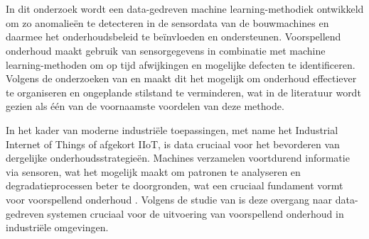 
\chapter{}%
\label{ch:methodologie}


In dit onderzoek wordt een data-gedreven machine learning-methodiek ontwikkeld om zo anomalieën te detecteren in de sensordata van de bouwmachines en daarmee het onderhoudsbeleid te beïnvloeden en ondersteunen. Voorspellend onderhoud maakt gebruik van sensorgegevens in combinatie met machine learning-methoden om op tijd afwijkingen en mogelijke defecten te identificeren. Volgens de onderzoeken van \textcite{Carvalho2019} en \textcite{ErRatby2025} maakt dit het mogelijk om onderhoud effectiever te organiseren en ongeplande stilstand te verminderen, wat in de literatuur wordt gezien als één van de voornaamste voordelen van deze methode.

In het kader van moderne industriële toepassingen, met name het Industrial Internet of Things of afgekort IIoT, is data cruciaal voor het bevorderen van dergelijke onderhoudsstrategieën. Machines verzamelen voortdurend informatie via sensoren, wat het mogelijk maakt om patronen te analyseren en degradatieprocessen beter te doorgronden, wat een cruciaal fundament vormt voor voorspellend onderhoud \autocite{Kapoor2025, WangXueyi2025}. Volgens de studie van \textcite{Kapoor2025} is deze overgang naar data-gedreven systemen cruciaal voor de uitvoering van voorspellend onderhoud in industriële omgevingen.

